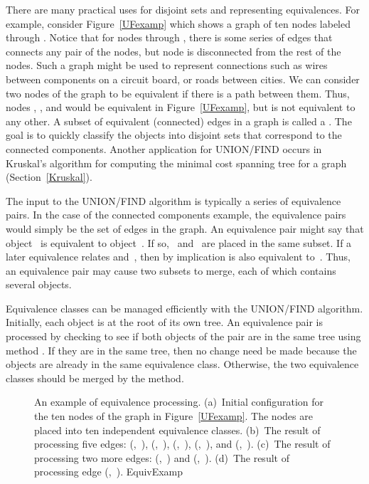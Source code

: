 There are many practical uses for disjoint sets and representing
equivalences.
For example, consider Figure~\ref{UFexamp} which shows a graph of
ten nodes labeled  through .
Notice that for nodes  through , there is some series
of edges that connects any pair of the nodes, but node  is
disconnected from the rest of the nodes.
Such a graph might be used to represent connections such as wires
between components on a circuit board, or roads between cities.
We can consider two nodes of the graph to be equivalent if there is a
path between them.
Thus, nodes , , and  would
be equivalent in Figure~\ref{UFexamp}, but  is not equivalent
to any other.
A subset of equivalent (connected) edges in a graph is called a
.
The goal is to quickly classify the objects
into disjoint sets that correspond to the connected components.
Another application for UNION/FIND occurs in Kruskal's algorithm for
computing the minimal cost spanning tree for a graph
(Section~\ref{Kruskal}).

The input to the UNION/FIND algorithm is typically  a series of
equivalence pairs.
In the case of the connected components example, the equivalence pairs 
would simply be the set of edges in the graph.
An equivalence pair might say that object~ is equivalent to
object~.
If so, ~and~ are placed in the same subset.
If a later equivalence relates  and~, then
by implication  is also equivalent to~.
Thus, an equivalence pair may cause two subsets to merge, each of
which contains several objects.


Equivalence classes can be managed efficiently with the UNION/FIND
algorithm.
Initially, each object is at the root of its own tree.
An equivalence pair is processed by checking to see if both objects
of the pair are in the same tree using method .
If they are in the same tree, then no change need be made because the
objects are already in the same equivalence class.
Otherwise, the two equivalence classes should be merged by the
 method.

\begin{figure}
\vspace{-\smallskipamount}
{An example of equivalence processing.
(a)~Initial configuration for the ten nodes of the graph in
Figure~\ref{UFexamp}.
The nodes are placed into ten independent equivalence classes.
(b)~The result of processing five edges:
(,~), (,~), (,~),
(,~), and (,~).
(c)~The result of processing two more edges:
(,~) and (,~).
(d)~The result of processing edge (,~).}
{EquivExamp}
\end{figure}


